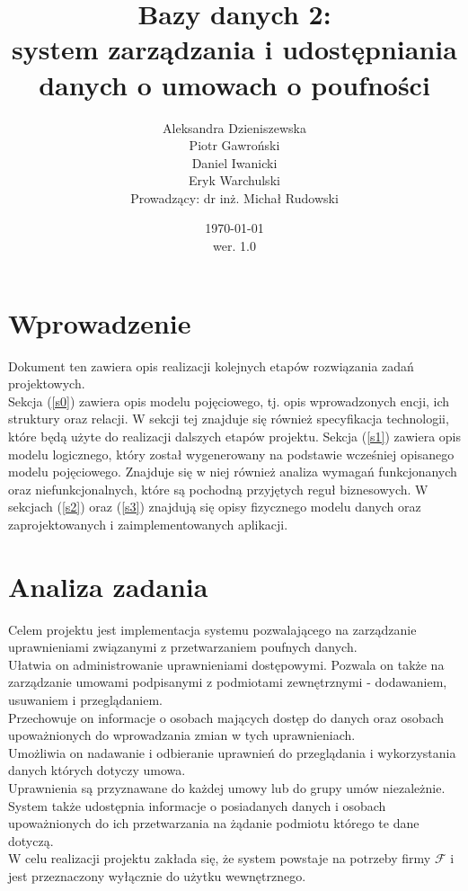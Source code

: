 \documentclass{article}
\title{Bazy danych 2: \\ system zarządzania i udostępniania danych o umowach o poufności}
\author{Aleksandra Dzieniszewska \\ Piotr Gawroński \\ Daniel Iwanicki \\ Eryk Warchulski\\ Prowadzący: dr inż. Michał Rudowski}
\date{\today\\wer. 1.0}
\begin{document}
\maketitle
{\footnotesize{\tableofcontents}}
\vspace*{\fill}
\vspace*{\fill}
\section{Wprowadzenie}
 Dokument ten zawiera opis realizacji kolejnych etapów rozwiązania zadań projektowych.\\
 Sekcja (\ref{s0}) zawiera opis modelu pojęciowego, tj. opis wprowadzonych encji, ich struktury oraz relacji.
 W sekcji tej znajduje się również specyfikacja technologii, które będą użyte do realizacji dalszych etapów projektu.
 Sekcja (\ref{s1}) zawiera opis modelu logicznego, który został wygenerowany na podstawie wcześniej opisanego modelu pojęciowego. 
 Znajduje się w niej również analiza wymagań funkcjonanych oraz niefunkcjonalnych, które są pochodną przyjętych reguł biznesowych.
 W  sekcjach (\ref{s2}) oraz (\ref{s3}) znajdują się opisy fizycznego modelu danych oraz zaprojektowanych i zaimplementowanych aplikacji. \\
\section{Analiza zadania}
Celem projektu jest implementacja systemu pozwalającego na zarządzanie uprawnieniami związanymi z przetwarzaniem poufnych danych.\\
Ułatwia on administrowanie uprawnieniami dostępowymi. Pozwala on także na zarządzanie umowami podpisanymi z podmiotami zewnętrznymi - dodawaniem, usuwaniem i przeglądaniem.\\
Przechowuje on informacje o osobach mających dostęp do danych oraz osobach upoważnionych do wprowadzania zmian w tych uprawnieniach.\\
Umożliwia on nadawanie i odbieranie uprawnień do przeglądania i wykorzystania danych których dotyczy umowa. \\
Uprawnienia są przyznawane do każdej umowy lub do grupy umów niezależnie.\\
System także udostępnia informacje o posiadanych danych i osobach upoważnionych do ich przetwarzania na żądanie podmiotu którego te dane dotyczą.\\
W celu realizacji projektu zakłada się, że system powstaje na potrzeby firmy $\mathcal{F}$ i jest przeznaczony wyłącznie do użytku wewnętrznego.
\end{document}
